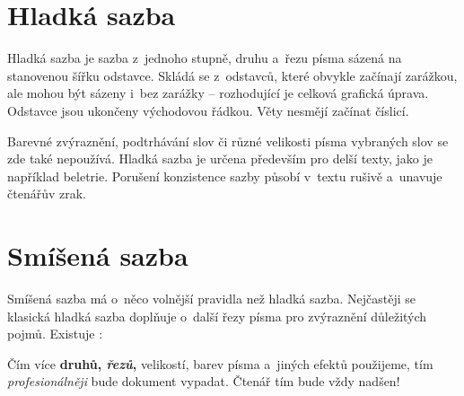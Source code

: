 \documentclass[a4paper, 11pt, twocolumn]{article}
\begin{document}

	\section{Hladká sazba}

	Hladká sazba je sazba z~jednoho stupně, druhu a~řezu písma sázená na stanovenou šířku odstavce. Skládá se z~odstavců,
	které obvykle začínají zarážkou, ale mohou být sázeny i~bez zarážky -- rozhodující je celková grafická úprava. Odstavce
	jsou ukončeny východovou řádkou. Věty nesmějí začínat číslicí.

	Barevné zvýraznění, podtrhávání slov či různé velikosti písma vybraných slov se zde také nepoužívá. Hladká sazba je určena
	především pro delší texty, jako je například beletrie. Porušení konzistence sazby působí v~textu rušivě a~unavuje čtenářův zrak.

	\section{Smíšená sazba}

	Smíšená sazba má o~něco volnější pravidla než hladká sazba. Nejčastěji se klasická hladká sazba doplňuje o~další řezy písma
	pro zvýraznění důležitých pojmů. Existuje :

	\begin{adjustwidth}{0.77cm}{0.88cm}
		\medskip
		\setlength{\parindent}{0.5cm}
		\hspace{\parindent}
		Čím více \textbf{druhů, \textit{řezů},} {\scriptsize velikostí}, barev pí\-sma a~jiných efektů použijeme, tím \textit{profesionálněji}
		bude dokument vypadat. Čtenář tím bude vždy {\Huge nadšen!}
		\medskip
	\end{adjustwidth}
\end{document}
